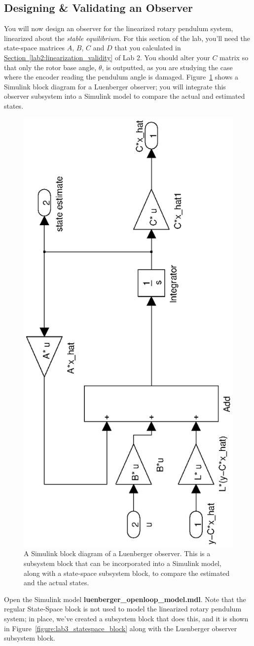 \subsection{Designing \& Validating an Observer}\label{sub section:lab3_observer_design}
You will now design an observer for the linearized rotary pendulum system, linearized about the \emph{stable equilibrium}. For this section of the lab, you'll need the state-space matrices $A$, $B$, $C$ and $D$ that you calculated in \hyperref[lab2:linearization_validity]{Section~\ref{lab2:linearization_validity}} of Lab 2. You should alter your $C$ matrix so that only the rotor base angle, $\theta$, is outputted, as you are studying the case where the encoder reading the pendulum angle is damaged. Figure~\ref{figure:lab3_luenberger_block} shows a Simulink block diagram for a Luenberger observer; you will integrate this observer subsystem into a Simulink model to compare the actual and estimated states.
\begin{figure}[htb!]
    \centering
    \includegraphics[width=0.4\linewidth,angle=-90]{eps/lab_3/luenberger_subsystem}
    \caption{A Simulink block diagram of a Luenberger observer. This is a subsystem block that can be incorporated into a Simulink model, along with a state-space subsystem block, to compare the estimated and the actual states.}
    \label{figure:lab3_luenberger_block}
\end{figure}
\newpage
Open the Simulink model \textbf{luenberger\_openloop\_model.mdl}. Note that the regular State-Space block is not used to model the linearized rotary pendulum system; in place, we've created a subsystem block that does this, and it is shown in Figure~\ref{figure:lab3_statespace_block} along with the Luenberger observer subsystem block.
